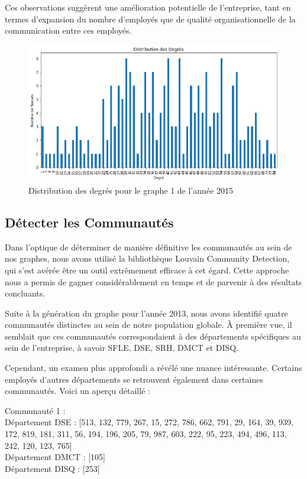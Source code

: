 \documentclass{article}
\begin{document}
Ces observations suggèrent une amélioration potentielle de l'entreprise, tant en termes d'expansion du nombre d'employés que de qualité organisationnelle de la communication entre ces employés.

\begin{figure}[h]
    \centering
    \includegraphics[width=16.4cm]{assets/communaute/distribution_deg_2015}
    \caption{Distribution des degrés pour le graphe 1 de l'année 2015}
    \label{fig:distribution_deg_2015}
\end{figure}

\subsection{Détecter les Communautés}

Dans l'optique de déterminer de manière définitive les communautés au sein de nos graphes, nous avons utilisé la bibliothèque Louvain Community Detection, qui s'est avérée être un outil extrêmement efficace à cet égard. Cette approche nous a permis de gagner considérablement en temps et de parvenir à des résultats concluants.

Suite à la génération du graphe pour l'année 2013, nous avons identifié quatre communautés distinctes au sein de notre population globale. À première vue, il semblait que ces communautés correspondaient à des départements spécifiques au sein de l'entreprise, à savoir SFLE, DSE, SRH, DMCT et DISQ.

Cependant, un examen plus approfondi a révélé une nuance intéressante. Certains employés d'autres départements se retrouvent également dans certaines communautés. Voici un aperçu détaillé :

Communauté 1 : \\

Département DSE : [513, 132, 779, 267, 15, 272, 786, 662, 791, 29, 164, 39, 939, 172, 819, 181, 311, 56, 194, 196, 205, 79, 987, 603, 222, 95, 223, 494, 496, 113, 242, 120, 123, 765] \\
Département DMCT : [105] \\
Département DISQ : [253] \\
\end{document}
